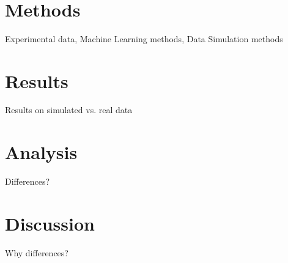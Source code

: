 \\
\section{Methods}

Experimental data, Machine Learning methods, Data Simulation methods
\\
\section{Results}

Results on simulated vs. real data
\\
\section{Analysis}

Differences?
\\
\section{Discussion}

Why differences?